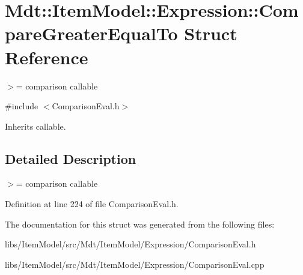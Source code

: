 \hypertarget{struct_mdt_1_1_item_model_1_1_expression_1_1_compare_greater_equal_to}{}\section{Mdt\+:\+:Item\+Model\+:\+:Expression\+:\+:Compare\+Greater\+Equal\+To Struct Reference}
\label{struct_mdt_1_1_item_model_1_1_expression_1_1_compare_greater_equal_to}


$>$= comparison callable  




{\ttfamily \#include $<$Comparison\+Eval.\+h$>$}



Inherits callable.



\subsection{Detailed Description}
$>$= comparison callable 

Definition at line 224 of file Comparison\+Eval.\+h.



The documentation for this struct was generated from the following files\+:\begin{DoxyCompactItemize}
\item 
libs/\+Item\+Model/src/\+Mdt/\+Item\+Model/\+Expression/Comparison\+Eval.\+h\item 
libs/\+Item\+Model/src/\+Mdt/\+Item\+Model/\+Expression/Comparison\+Eval.\+cpp\end{DoxyCompactItemize}
